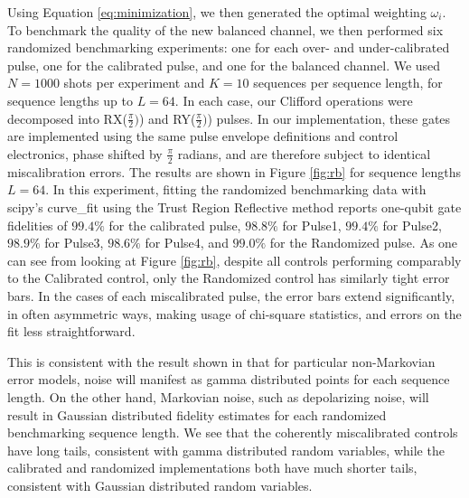 \documentclass[aps,nofootinbib,pra,notitlepage,twocolumn]{revtex4-1}
\begin{document}
Using Equation \ref{eq:minimization}, we then generated the optimal weighting $\omega_i$. To benchmark the quality of the new balanced channel, we then performed six randomized benchmarking experiments: one for each over- and under-calibrated pulse, one for the calibrated pulse, and one for the balanced channel. We used $N=1000$ shots per experiment and $K=10$ sequences per sequence length, for sequence lengths up to $L=64$\cite{Magesan2011}. In each case, our Clifford operations were decomposed into RX($\frac{\pi}{2})$) and RY($\frac{\pi}{2})$) pulses. In our implementation, these gates are implemented using the same pulse envelope definitions and control electronics, phase shifted by $\frac{\pi}{2}$ radians, and are therefore subject to identical miscalibration errors. The results are shown in Figure \ref{fig:rb} for sequence lengths $L=64$. In this experiment, fitting the randomized benchmarking data with scipy's curve\_fit using the Trust Region Reflective method reports one-qubit gate fidelities of $99.4\%$ for the calibrated pulse, $98.8\%$ for Pulse1, $99.4\%$ for Pulse2, $98.9\%$ for Pulse3, $98.6\%$ for Pulse4, and $99.0\%$ for the Randomized pulse. As one can see from looking at Figure \ref{fig:rb}, despite all controls performing comparably to the Calibrated control, only the Randomized control has similarly tight error bars. In the cases of each miscalibrated pulse, the error bars extend significantly, in often asymmetric ways, making usage of chi-square statistics, and errors on the fit less straightforward.

This is consistent with the result shown in \cite{Ball2016} that for particular non-Markovian error models, noise will manifest as gamma distributed points for each sequence length. On the other hand, Markovian noise, such as depolarizing noise, will result in Gaussian distributed fidelity estimates for each randomized benchmarking sequence length. We see that the coherently miscalibrated controls have long tails, consistent with gamma distributed random variables, while the calibrated and randomized implementations both have much shorter tails, consistent with Gaussian distributed random variables. 
\end{document}
